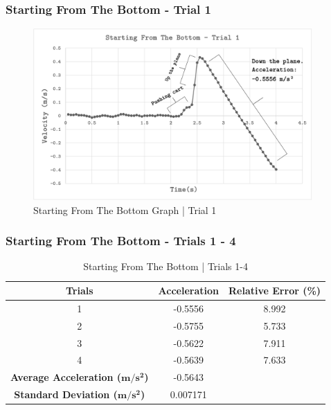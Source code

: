 \documentclass[a4paper,12pt]{article}
\begin{document}
\subsubsection{Starting From The Bottom - Trial 1}
\begin{figure}[H]
	\begin{center}
		\includegraphics[width=0.95\textwidth]{cartg2.png}
	\end{center}
	\caption{Starting From The Bottom Graph | Trial 1}
	\label{fig: cartg2}
\end{figure} 


\subsubsection{Starting From The Bottom - Trials 1 - 4}

\begin{table}[H]
\centering
\begin{tabular}{@{}ccc@{}}
\toprule
\textbf{Trials} & \textbf{Acceleration} & \textbf{Relative Error (\%)} \\ \midrule
1 & -0.5556 & 8.992 \\
2 & -0.5755 & 5.733 \\
3 & -0.5622 & 7.911 \\
4 & -0.5639 & 7.633 \\ \midrule
\textbf{Average Acceleration ($\boldsymbol{m/s^2}$)} & -0.5643 &  \\
\textbf{Standard Deviation ($\boldsymbol{m/s^2}$)} & 0.007171 &  \\ \bottomrule
\end{tabular}
\caption{Starting From The Bottom | Trials 1-4}
\label{tab:ip-sftb}
\end{table}
\end{document}
